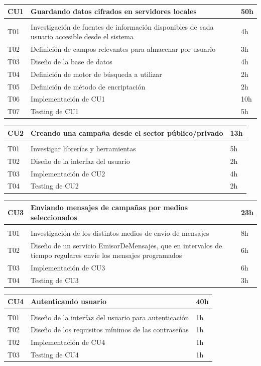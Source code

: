 \documentclass[a4paper, 10pt, twoside]{article}
\begin{document}
\begin{tabular}{lp{13cm}l}
	\hline
	CU1 & Guardando datos cifrados en servidores locales & 50h \\
	\hline \\
	T01 & Investigación de fuentes de información disponibles de cada usuario accesible desde el sistema & 4h \\
	T02 & Definición de campos relevantes para almacenar por usuario & 3h \\
	T03 & Diseño de la base de datos & 4h \\
	T04 & Definición de motor de búsqueda a utilizar & 2h \\
	T05 & Definición de método de encriptación & 2h \\
	T06 & Implementación de CU1 & 10h\\
	T07 & Testing de CU1 & 5h \\
	\hline
\end{tabular}

\begin{tabular}{lp{13cm}l}
	\hline
	CU2 & Creando una campaña desde el sector público/privado & 13h \\
	\hline \\
	T01 & Investigar librerías y herramientas  & 5h \\
	T02 & Diseño de la interfaz del usuario & 2h \\
	T03 & Implementación de CU2 & 4h \\
	T04 & Testing de CU2 & 2h \\
	\hline
\end{tabular}

\begin{tabular}{lp{13cm}l}
	\hline
	CU3 &  Enviando mensajes de campañas por medios seleccionados & 23h \\
	\hline \\
	T01 & Investigación de los distintos medios de envío de mensajes & 8h \\
	T02 & Diseño de un servicio EmisorDeMensajes, que en intervalos de tiempo regulares envíe los mensajes programados & 6h \\
	T03 & Implementación de CU3 & 6h \\
	T04 & Testing de CU3 & 3h \\
	\hline
\end{tabular}

\begin{tabular}{lp{13cm}l}
	\hline
	CU4 & Autenticando usuario & 40h \\
	\hline \\
	T01 & Diseño de la interfaz del usuario para autenticación & 1h \\
	T02 & Diseño de los requisitos mínimos de las contraseñas & 1h \\
	T02 & Implementación de CU4 & 1h \\
	T03 & Testing de CU4 & 1h \\
	\hline
\end{tabular}
\end{document}
